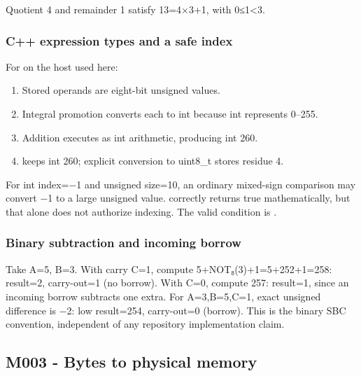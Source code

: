 Quotient 4 and remainder 1 satisfy 13=4×3+1, with 0≤1\textless3.

\subsubsection{C++ expression types and a safe index}\label{appendix-92ff77d4dfdc-c-expression-types-and-a-safe-index}

\hypertarget{appendix-92ff77d4dfdc-c-expression-types-and-a-safe-index}{}

For  on the host used here:

\begin{enumerate}
\def\labelenumi{\arabic{enumi}.}
\tightlist
\item
  Stored operands are eight-bit unsigned values.
\item
  Integral promotion converts each to int because int represents 0--255.
\item
  Addition executes as int arithmetic, producing int 260.
\item
   keeps int 260; explicit conversion to uint8\_t stores residue 4.
\end{enumerate}

For int index=−1 and unsigned size=10, an ordinary mixed-sign comparison may convert −1 to a large unsigned value.  correctly returns true mathematically, but that alone does not authorize indexing. The valid condition is .

\subsubsection{Binary subtraction and incoming borrow}\label{appendix-92ff77d4dfdc-binary-subtraction-and-incoming-borrow}

\hypertarget{appendix-92ff77d4dfdc-binary-subtraction-and-incoming-borrow}{}

Take A=5, B=3. With carry C=1, compute 5+NOT₈(3)+1=5+252+1=258: result=2, carry-out=1 (no borrow). With C=0, compute 257: result=1, since an incoming borrow subtracts one extra. For A=3,B=5,C=1, exact unsigned difference is −2: low result=254, carry-out=0 (borrow). This is the binary SBC convention, independent of any repository implementation claim.

\subsection{M003 - Bytes to physical memory}\label{appendix-92ff77d4dfdc-m003---bytes-to-physical-memory}

